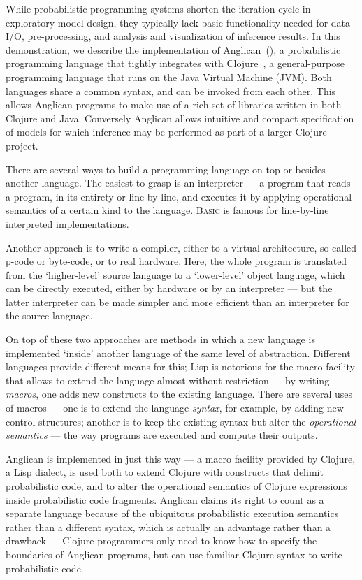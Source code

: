 \documentclass[preprint]{sigplanconf}
\begin{document}
While probabilistic programming systems shorten the iteration cycle in
exploratory model design, they typically lack basic functionality needed for
data I/O, pre-processing, and analysis and visualization of inference results.
In this demonstration, we describe the implementation of
Anglican~(\cite{TMW15, Anglican}), a probabilistic
programming language that tightly integrates with
Clojure~\cite{H08,Clojure}, a general-purpose programming language
that runs on the Java Virtual Machine (JVM). Both languages share a common
syntax, and can be invoked from each other. This allows Anglican programs to
make use of a rich set of libraries written in both Clojure and Java.
Conversely Anglican allows intuitive and compact specification of models for
which inference may be performed as part of a larger Clojure project.

There are several ways to build a programming language
on top or besides another language.  The easiest to grasp is an
interpreter --- a program that reads a program, in its entirety
or line-by-line, and executes it by applying operational
semantics of a certain kind to the language. \textsc{Basic} is
famous for line-by-line interpreted implementations.

Another approach is to write a compiler, either to a virtual
architecture, so called p-code or byte-code, or to real
hardware. Here, the whole program is translated from the
`higher-level' source language to a `lower-level' object
language, which can be directly executed, either by hardware or
by an interpreter --- but the latter interpreter can be made
simpler and more efficient  than an interpreter for the source
language.

On top of these two approaches are methods in which a new
language is implemented `inside' another language of the same
level of abstraction. Different languages provide different
means for this; Lisp is notorious for the macro facility
that allows to extend the language almost without
restriction --- by writing \textit{macros}, one adds new
constructs to the existing language. There are several uses of
macros --- one is to extend the language \textit{syntax}, for
example, by adding new control structures; another is to keep
the existing syntax but alter the \textit{operational semantics}
--- the way programs are executed and compute their outputs.

Anglican is implemented in just this way --- a macro facility
provided by Clojure, a Lisp dialect, is used both to extend
Clojure with constructs that delimit probabilistic code, and to
alter the operational semantics of Clojure expressions inside
probabilistic code fragments. Anglican claims its right to count
as a separate language because of the ubiquitous probabilistic
execution semantics rather than a different syntax,
which is actually an advantage rather than a drawback ---
Clojure programmers only need to know how to specify the
boundaries of Anglican programs, but can use familiar Clojure
syntax to write probabilistic code. 
\end{document}

